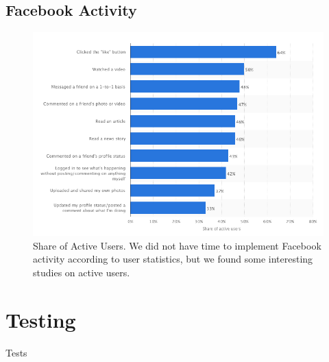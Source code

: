\documentclass{article}
\begin{document}
\subsection*{Facebook Activity}
\begin{figure}[H]
  \includegraphics[width=\linewidth]{fbact.png}
  \caption{Share of Active Users. \cite{fbactwebsite} We did not have time to implement Facebook activity according to user statistics, but we found some interesting studies on active users.}
  \label{fig:fbact}
\end{figure}

\section*{Testing}
Tests
\end{document}
